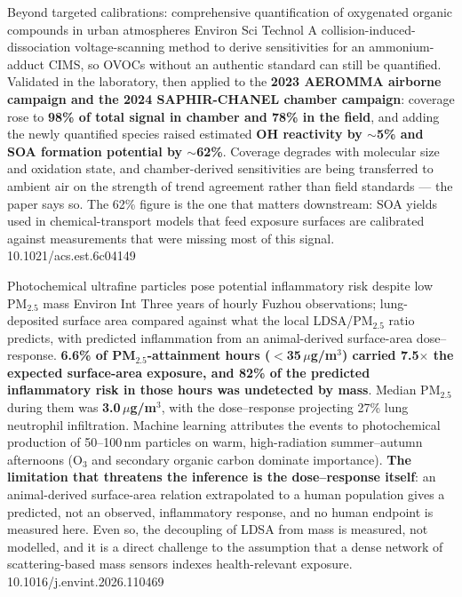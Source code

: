\documentclass[10pt]{article}
\begin{document}
{Beyond targeted calibrations: comprehensive quantification of oxygenated organic compounds in urban atmospheres}
{Environ Sci Technol}
{A collision-induced-dissociation voltage-scanning method to derive sensitivities for an
ammonium-adduct CIMS, so OVOCs without an authentic standard can still be quantified.
Validated in the laboratory, then applied to the \textbf{2023 AEROMMA airborne campaign
and the 2024 SAPHIR-CHANEL chamber campaign}: coverage rose to \textbf{98\% of total
signal in chamber and 78\% in the field}, and adding the newly quantified species raised
estimated \textbf{OH reactivity by $\sim$5\% and SOA formation potential by $\sim$62\%}.
Coverage degrades with molecular size and oxidation state, and chamber-derived
sensitivities are being transferred to ambient air on the strength of trend agreement
rather than field standards --- the paper says so. The 62\% figure is the one that matters
downstream: SOA yields used in chemical-transport models that feed exposure surfaces are
calibrated against measurements that were missing most of this signal.}
{10.1021/acs.est.6c04149}


{Photochemical ultrafine particles pose potential inflammatory risk despite low PM$_{2.5}$ mass}
{Environ Int}
{Three years of hourly Fuzhou observations; lung-deposited surface area compared against
what the local LDSA/PM$_{2.5}$ ratio predicts, with predicted inflammation from an
animal-derived surface-area dose--response. \textbf{6.6\% of PM$_{2.5}$-attainment hours
($<$35\,$\mu$g/m$^3$) carried 7.5$\times$ the expected surface-area exposure, and 82\% of
the predicted inflammatory risk in those hours was undetected by mass}. Median
PM$_{2.5}$ during them was \textbf{3.0\,$\mu$g/m$^3$}, with the dose--response projecting
27\% lung neutrophil infiltration. Machine learning attributes the events to photochemical
production of 50--100\,nm particles on warm, high-radiation summer--autumn afternoons
(O$_3$ and secondary organic carbon dominate importance). \textbf{The limitation that
threatens the inference is the dose--response itself}: an animal-derived surface-area
relation extrapolated to a human population gives a predicted, not an observed,
inflammatory response, and no human endpoint is measured here. Even so, the decoupling of
LDSA from mass is measured, not modelled, and it is a direct challenge to the assumption
that a dense network of scattering-based mass sensors indexes health-relevant exposure.}
{10.1016/j.envint.2026.110469}
\end{document}
